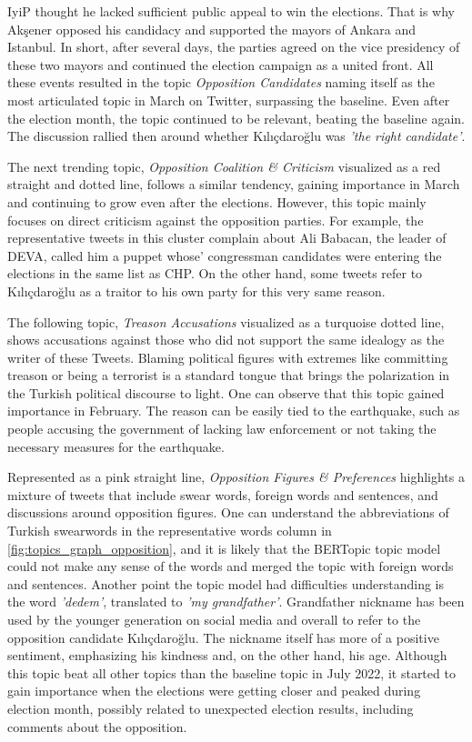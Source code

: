 \ac{IyiP} thought he lacked sufficient public appeal to win the elections. 
That is why Akşener opposed his candidacy and supported the mayors of Ankara and Istanbul. 
In short, after several days, the parties agreed on the vice presidency of these two mayors and 
continued the election campaign as a united front. All these events resulted in the topic 
\textit{Opposition Candidates} naming itself as the most articulated topic in March on Twitter, 
surpassing the baseline. Even after the election month, the topic continued to be relevant, 
beating the baseline again. The discussion rallied then around whether Kılıçdaroğlu was 
\textit{'the right candidate'}.


The next trending topic, \textit{Opposition Coalition \& Criticism} visualized as a red straight 
and dotted line, follows a similar tendency, gaining importance in March and continuing to 
grow even after the elections. However, this topic mainly focuses on direct criticism against 
the opposition parties. For example, the representative tweets in this cluster complain about 
Ali Babacan, the leader of \ac{DEVA}, called him a puppet whose' congressman candidates were 
entering the elections in the same list as \ac{CHP}. On the other hand, some tweets refer to 
Kılıçdaroğlu as a traitor to his own party for this very same reason.

The following topic, \textit{Treason Accusations} visualized as a turquoise dotted line, shows 
accusations against those who did not support the same idealogy as the writer of these Tweets. 
Blaming political figures with extremes like committing treason or being a terrorist is a standard 
tongue that brings the polarization in the Turkish political discourse to light. 
One can observe that this topic gained importance in February. 
The reason can be easily tied to the earthquake, such as people accusing the government of lacking 
law enforcement or not taking the necessary measures for the earthquake.

Represented as a pink straight line, \textit{Opposition Figures \& Preferences} highlights a mixture of 
tweets that include swear words, foreign words and sentences, and discussions around opposition figures.
One can understand the abbreviations of Turkish swearwords in the representative words column in 
\autoref{fig:topics_graph_opposition}, and it is likely that the BERTopic topic model could not make any 
sense of the words and merged the topic with foreign words and sentences. 
Another point the topic model had difficulties understanding is the word \textit{'dedem'}, 
translated to \textit{'my grandfather'}. Grandfather nickname has been used by the younger generation on 
social media and overall to refer to the opposition candidate Kılıçdaroğlu. The nickname itself has more of a 
positive sentiment, emphasizing his kindness and, on the other hand, his age. 
Although this topic beat all other topics than the baseline topic in July 2022, it started to gain importance 
when the elections were getting closer and peaked during election month, possibly related to unexpected 
election results, including comments about the opposition.

